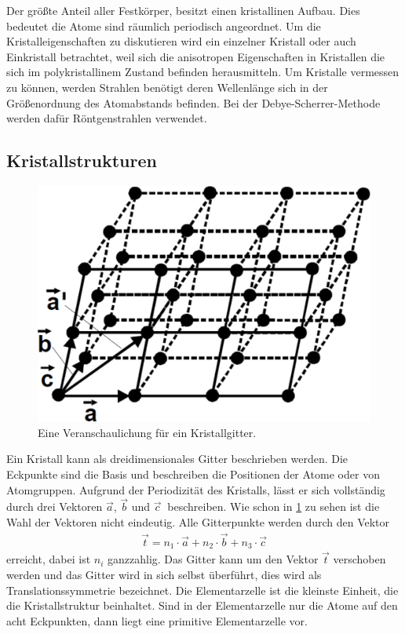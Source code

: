 Der größte Anteil aller Festkörper, besitzt einen kristallinen Aufbau. Dies bedeutet die Atome sind räumlich periodisch angeordnet. Um die Kristalleigenschaften zu diskutieren wird ein einzelner Kristall oder auch Einkristall betrachtet, weil sich die anisotropen Eigenschaften in Kristallen die sich im polykristallinem Zustand befinden herausmitteln. Um Kristalle vermessen zu können, werden Strahlen benötigt deren Wellenlänge sich in der Größenordnung des Atomabstands befinden. Bei der Debye-Scherrer-Methode werden dafür Röntgenstrahlen verwendet.
\subsection{Kristallstrukturen}
\begin{figure}[h!]
	\centering
	\includegraphics[scale = 0.4]{../Grafiken/Gitter.pdf}
	\caption{Eine Veranschaulichung für ein Kristallgitter.\cite{V41}}
	\label{fig:BeispielGitter}
\end{figure}
Ein Kristall kann als dreidimensionales Gitter beschrieben werden. Die Eckpunkte sind die Basis und beschreiben die Positionen der Atome oder von Atomgruppen.
Aufgrund der Periodizität des Kristalls, lässt er sich vollständig durch drei Vektoren $\vec{a}$, $\vec{b}$ und $\vec{c}\ $ beschreiben. Wie schon in \cref{fig:BeispielGitter} zu sehen ist die Wahl der Vektoren nicht eindeutig. Alle Gitterpunkte werden durch den Vektor 
\begin{align}
	\vec{t}= n_1\cdot \vec{a} + n_2 \cdot \vec{b} + n_3 \cdot \vec{c} \label{eq:GitterVektor}
\end{align}
erreicht, dabei ist $n_i$ ganzzahlig. Das Gitter kann um den Vektor $\vec{t}$ verschoben werden und das Gitter wird in sich selbst überführt, dies wird als Translationssymmetrie bezeichnet. Die Elementarzelle ist die kleinste Einheit, die die Kristallstruktur beinhaltet. Sind in der Elementarzelle nur die Atome auf den acht Eckpunkten, dann liegt eine primitive Elementarzelle vor.\\
